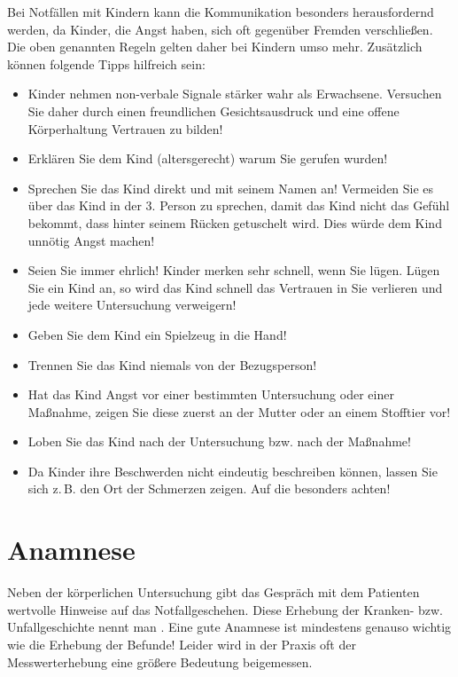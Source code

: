 { Bei Notfällen mit Kindern kann die Kommunikation besonders herausfordernd
werden, da Kinder, die Angst haben, sich oft gegenüber Fremden verschließen. Die
oben genannten Regeln gelten daher bei Kindern umso mehr. Zusätzlich können
folgende Tipps hilfreich sein:

\begin{itemize}
  \item Kinder nehmen non-verbale Signale stärker wahr als Erwachsene.
  Versuchen Sie daher durch einen freundlichen Gesichtsausdruck und eine
  offene Körperhaltung Vertrauen zu bilden!
  \item Erklären Sie dem Kind (altersgerecht) warum Sie gerufen wurden!
  \item Sprechen Sie das Kind direkt und mit seinem Namen an! Vermeiden  Sie
  es über das Kind in der 3. Person zu sprechen, damit das Kind nicht das
  Gefühl  bekommt, dass hinter seinem Rücken getuschelt wird. Dies würde dem
  Kind unnötig Angst machen!
  \item Seien Sie immer ehrlich! Kinder merken sehr schnell, wenn Sie lügen.
  Lügen  Sie ein Kind an, so wird das Kind schnell das Vertrauen in Sie
  verlieren  und jede weitere Untersuchung verweigern!
  \item Geben Sie dem Kind ein Spielzeug in die Hand!
  \item Trennen Sie das Kind niemals von der Bezugsperson!
  \item Hat das Kind Angst vor einer bestimmten Untersuchung oder einer
  Maßnahme, zeigen Sie diese zuerst an der Mutter oder an einem Stofftier vor!
  \item Loben Sie das Kind nach der Untersuchung bzw. nach der Maßnahme!
  \item Da Kinder ihre Beschwerden nicht eindeutig beschreiben können, lassen
  Sie sich z.\,B. den Ort der Schmerzen zeigen. Auf die 
  besonders achten!
\end{itemize}
}{
{\SymbolText}
}


\section{Anamnese}


Neben der körperlichen Untersuchung gibt das Gespr\"ach mit dem Patienten
wertvolle Hinweise auf das Notfallgeschehen. Diese Erhebung der Kranken- bzw.
Unfallgeschichte nennt man . Eine gute Anamnese ist mindestens
genauso wichtig wie die Erhebung der Befunde! Leider wird in der Praxis oft der
Messwerterhebung eine größere Bedeutung beigemessen.

